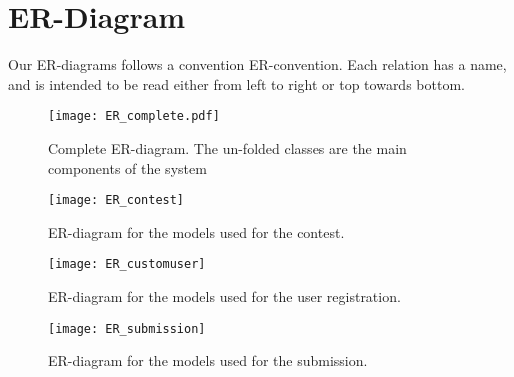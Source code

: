 \chapter{ER-Diagram}\label{appendix:ER}
Our ER-diagrams follows a convention ER-convention. Each relation has a name,
and is intended to be read either from left to right or top towards bottom.

\begin{figure}[h!]
	\texttt{[image: ER\_complete.pdf]}
	\caption{Complete ER-diagram. The un-folded classes are the main components
    of the system}
	\label{fig:ERComplete}
\end{figure}

\begin{figure}[h!]
	\texttt{[image: ER\_contest]}
    \caption{ER-diagram for the models used for the contest.}
	\label{fig:ERContest}
\end{figure}

\begin{figure}[h!]
	\texttt{[image: ER\_customuser]}
    \caption{ER-diagram for the models used for the user registration.}
	\label{fig:ERCustomuser}
\end{figure}

\begin{figure}[h!]
	\texttt{[image: ER\_submission]}
    \caption{ER-diagram for the models used for the submission.}
	\label{fig:ERSubmission}
\end{figure}
